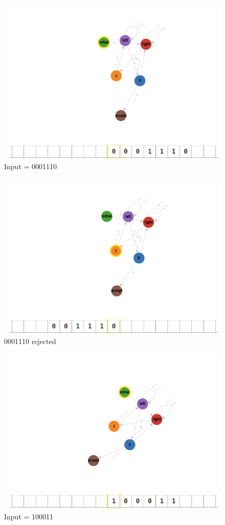 \documentclass[12pt]{article}
\begin{document}
\begin{figure}[H]
    \caption{Input = 0001110}
    \centering
    \includegraphics[width=12cm]{Q1/0001110.png}  
\end{figure}
\begin{figure}[H]
    \caption{0001110 rejected}
    \centering
    \includegraphics[width=12cm]{Q1/0001110o.png}  
\end{figure}
\begin{figure}[H]
    \caption{Input = 100011}
    \centering
    \includegraphics[width=12cm]{Q1/100011.png}
\end{figure}
\end{document}
